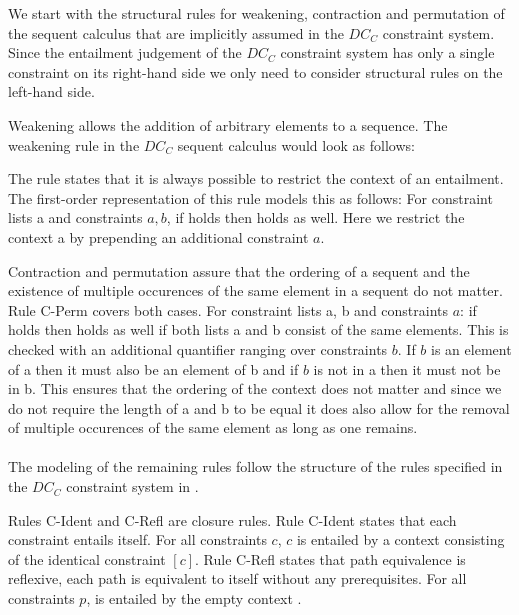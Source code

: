 We start with the structural rules for weakening, contraction and permutation
of the sequent calculus that are implicitly assumed in the $DC_C$ constraint system.
Since the entailment judgement of the $DC_C$ constraint system
has only a single constraint on its right-hand side
we only need to consider structural rules on the left-hand side.

Weakening allows the addition of arbitrary elements to a sequence.
The weakening rule in the $DC_C$ sequent calculus would look as follows:
\begin{prooftree}
\end{prooftree}
The rule states that it is always possible to restrict the context of an entailment.
The first-order representation of this rule models this as follows:
For constraint lists \ovl a and constraints $a, b$,
if  holds then  holds as well.
Here we restrict the context \ovl a by prepending an additional constraint $a$.

Contraction and permutation assure that the ordering of a sequent
and the existence of multiple occurences of the same element in a sequent
do not matter. Rule C-Perm covers both cases.
For constraint lists \ovl a, \ovl b and constraints $a$:
if  holds then  holds as well
if both lists \ovl a and \ovl b consist of the same elements.
This is checked with an additional quantifier ranging over constraints $b$.
If $b$ is an element of \ovl a then it must also be an element of \ovl b
and if $b$ is not in \ovl a then it must not be in \ovl b.
This ensures that the ordering of the context does not matter
and since we do not require the length of \ovl a and \ovl b to be equal
it does also allow for the removal of multiple occurences of the same element
as long as one remains.
\\\\
The modeling of the remaining rules follow the structure of the rules
specified in the $DC_C$ constraint system in .

Rules C-Ident and C-Refl are closure rules.
Rule C-Ident states that each constraint entails itself.
For all constraints $c$, $c$ is entailed by a context consisting
of the identical constraint $[c]$.
Rule C-Refl states that path equivalence is reflexive,
each path is equivalent to itself without any prerequisites.
For all constraints $p$,  is entailed by the empty context \nil.

